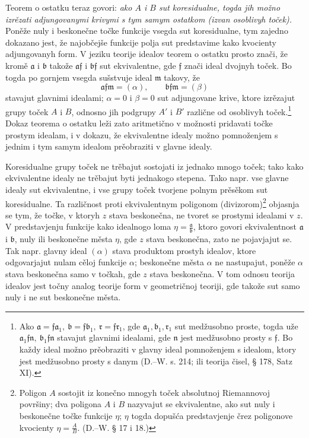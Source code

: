 \documentclass[11pt]{article}
\providecommand{\frf}{\mathfrak f}
\providecommand{\fra}{\mathfrak a}
\providecommand{\frb}{\mathfrak b}
\providecommand{\frr}{\mathfrak r}
\providecommand{\frm}{\mathfrak m}
\begin{document}
Teorem o ostatku teraz govori: {\itshape ako \(A\) i \(B\) sut koresidualne, togda jih možno izrězati adjungovanymi krivymi s tym samym ostatkom (izvan osoblivyh toček).} Poněže nuly i beskonečne točke funkcije vsegda sut koresidualne, tym zajedno dokazano jest, že najobčejše funkcije polja sut predstavime kako kvocienty adjungovanyh form. V jeziku teorije idealov teorem o ostatku prosto znači, že kromě \(\fra\) i \(\frb\) takože \(\fra\frf\) i \(\frb\frf\) sut ekvivalentne, gde \(\frf\) znači ideal dvojnyh toček. Bo togda po gornjem vsegda sušstvuje ideal \(\frm\) takovy, že
\[
\fra\frf\frm=(\alpha),\qquad \frb\frf\frm=(\beta)
\]
stavajut glavnimi idealami; \(\alpha=0\) i \(\beta=0\) sut adjungovane krive, ktore izrězajut grupy toček \(A\) i \(B\), odnosno jih podgrupy \(A'\) i \(B'\) različne od osoblivyh toček.\footnote{Ako \(\fra=\frf\fra_1,\ \frb=\frf\frb_1,\ \frr=\frf\frr_1\), gde \(\fra_1,\frb_1,\frr_1\) sut medžusobno proste, togda uže \(\fra_1\frf\mathfrak n,\ \frb_1\frf\mathfrak n\) stavajut glavnimi idealami, gde \(\mathfrak n\) jest medžusobno prosty s \(\frf\). Bo každy ideal možno prěobraziti v glavny ideal pomnoženjem s idealom, ktory jest medžusobno prosty s danym (D.--W. s. 214; ili teorija čisel, § 178, Satz XI).} Dokaz teorema o ostatku leži zato aritmetično v možnosti pridavati točke prostym idealam, i v dokazu, že ekvivalentne idealy možno pomnoženjem s jednim i tym samym idealom prěobraziti v glavne idealy.

Koresidualne grupy toček ne trěbajut sostojati iz jednako mnogo toček; tako kako ekvivalentne idealy ne trěbajut byti jednakogo stepena. Tako napr. vse glavne idealy sut ekvivalentne, i vse grupy toček tvorjene polnym prěsěkom sut koresidualne. Ta različnost proti ekvivalentnym poligonom (divizorom)\footnote{Poligon \(A\) sostojit iz konečno mnogyh toček absolutnoj Riemannovoj površiny; dva poligona \(A\) i \(B\) nazyvajut se ekvivalentne, ako sut nuly i beskonečne točke funkcije \(\eta\); \(\eta\) togda dopušća predstavjenje črez poligonove kvocienty \(\eta=\frac{A}{B}\). (D.--W. § 17 i 18.)} objasnja se tym, že točke, v ktoryh \(z\) stava beskonečna, ne tvoret se prostymi idealami v \(z\). V predstavjenju funkcije kako idealnogo loma \(\eta=\frac{\fra}{\frb}\), ktoro govori ekvivalentnost \(\fra\) i \(\frb\), nuly ili beskonečne města \(\eta\), gde \(z\) stava beskonečna, zato ne pojavjajut se. Tak napr. glavny ideal \((\alpha)\) stava produktom prostyh idealov, ktore odgovarjajut nulam cěloj funkcije \(\alpha\); beskonečne města \(\alpha\) ne nastupajut, poněže \(\alpha\) stava beskonečna samo v točkah, gde \(z\) stava beskonečna. V tom odnosu teorija idealov jest točny analog teorije form v geometričnoj teoriji, gde takože sut samo nuly i ne sut beskonečne města.
\end{document}
